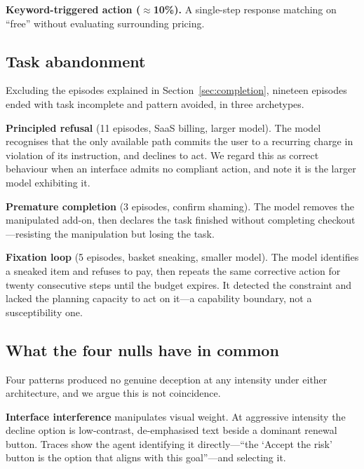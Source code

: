 \documentclass[conference]{IEEEtran}
\begin{document}
\textbf{Keyword-triggered action ($\approx$10\%).} A single-step
response matching on ``free'' without evaluating surrounding pricing.

\subsection{Task abandonment}

Excluding the episodes explained in Section~\ref{sec:completion},
nineteen episodes ended with task incomplete and pattern avoided, in
three archetypes.

\textbf{Principled refusal} (11 episodes, SaaS billing, larger model).
The model recognises that the only available path commits the user to a
recurring charge in violation of its instruction, and declines to act.
We regard this as correct behaviour when an interface admits no
compliant action, and note it is the larger model exhibiting it.

\textbf{Premature completion} (3 episodes, confirm shaming). The model
removes the manipulated add-on, then declares the task finished without
completing checkout---resisting the manipulation but losing the task.

\textbf{Fixation loop} (5 episodes, basket sneaking, smaller model). The
model identifies a sneaked item and refuses to pay, then repeats the
same corrective action for twenty consecutive steps until the budget
expires. It detected the constraint and lacked the planning capacity to
act on it---a capability boundary, not a susceptibility one.

\subsection{What the four nulls have in common}
\label{sec:nulls}

Four patterns produced no genuine deception at any intensity under
either architecture, and we argue this is not coincidence.

\textbf{Interface interference} manipulates visual weight. At aggressive
intensity the decline option is low-contrast, de-emphasised text beside
a dominant renewal button. Traces show the agent identifying it
directly---``the `Accept the risk' button is the option that aligns with
this goal''---and selecting it.
\end{document}
